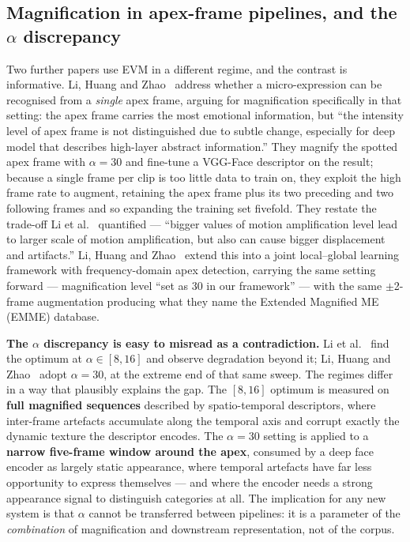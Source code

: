 \subsection{Magnification in apex-frame pipelines, and the $\alpha$ discrepancy}
\label{sec:evm-apex}

Two further papers use EVM in a different regime, and the contrast is informative. Li, Huang and Zhao~\cite{liY2018} address whether a micro-expression can be recognised from a \textit{single} apex frame, arguing for magnification specifically in that setting: the apex frame carries the most emotional information, but ``the intensity level of apex frame is not distinguished due to subtle change, especially for deep model that describes high-layer abstract information.'' They magnify the spotted apex frame with \textbf{$\alpha = 30$} and fine-tune a VGG-Face descriptor on the result; because a single frame per clip is too little data to train on, they exploit the high frame rate to augment, retaining the apex frame plus its two preceding and two following frames and so expanding the training set fivefold. They restate the trade-off Li et al.~\cite{liX2018} quantified --- ``bigger values of motion amplification level lead to larger scale of motion amplification, but also can cause bigger displacement and artifacts.'' Li, Huang and Zhao~\cite{liY2021} extend this into a joint local--global learning framework with frequency-domain apex detection, carrying the same setting forward --- magnification level ``set as 30 in our framework'' --- with the same $\pm$2-frame augmentation producing what they name the Extended Magnified ME (EMME) database.

\textbf{The $\alpha$ discrepancy is easy to misread as a contradiction.} Li et al.~\cite{liX2018} find the optimum at $\alpha \in [8, 16]$ and observe degradation beyond it; Li, Huang and Zhao~\cite{liY2018,liY2021} adopt $\alpha = 30$, at the extreme end of that same sweep. The regimes differ in a way that plausibly explains the gap. The $[8, 16]$ optimum is measured on \textbf{full magnified sequences} described by spatio-temporal descriptors, where inter-frame artefacts accumulate along the temporal axis and corrupt exactly the dynamic texture the descriptor encodes. The $\alpha = 30$ setting is applied to a \textbf{narrow five-frame window around the apex}, consumed by a deep face encoder as largely static appearance, where temporal artefacts have far less opportunity to express themselves --- and where the encoder needs a strong appearance signal to distinguish categories at all. The implication for any new system is that $\alpha$ cannot be transferred between pipelines: it is a parameter of the \textit{combination} of magnification and downstream representation, not of the corpus.

